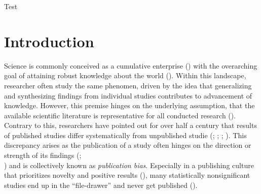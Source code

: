 \documentclass[
  12pt,
]{scrartcl}
\begin{document}
Test

\newpage


\tableofcontents

\newpage

\section{Introduction}\label{introduction}

Science is commonly conceived as a cumulative enterprise
() with the
overarching goal of attaining robust knowledge about the world
(). Within this
landscape, researcher often study the same phenomen, driven by the idea
that generalizing and synthesizing findings from individual studies
contributes to advancement of knowledge. However, this premise hinges on
the underlying assumption, that the available scientific literature is
representative for all conducted research
(). Contrary to
this, researchers have pointed out for over half a century that results
of published studies differ systematically from unpublished studie
(;
;
;
). This
discrepancy arises as the publication of a study often hinges on the
direction or strength of its findings
(;\\
) and
is collectively known as \emph{publication bias}. Especially in a
publishing culture that prioritizes novelty and positive results
(), many
statistically nonsignificant studies end up in the ``file-drawer'' and
never get published ().
\end{document}
